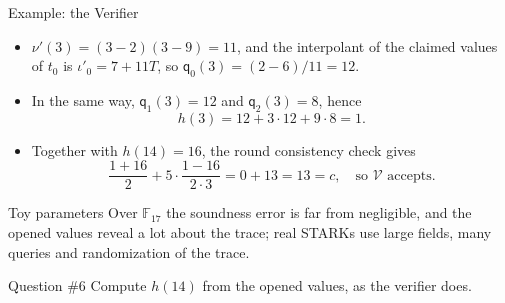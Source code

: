 \documentclass{zkdl-presentation-template}
\begin{document}
    \begin{frame}{Example: the Verifier}
        \begin{itemize}
            \item $\nu'(3) = (3 - 2)(3 - 9) = 11$, and the interpolant of the claimed values of $t_0$ is $\iota'_0 = 7 + 11T$, so $\mathsf{q}_0(3) = (2 - 6)/11 = 12$.\pause
            \item In the same way, $\mathsf{q}_1(3) = 12$ and $\mathsf{q}_2(3) = 8$, hence
            \begin{equation*}
                h(3) = 12 + 3 \cdot 12 + 9 \cdot 8 = 1.
            \end{equation*}
            \pause
            \vspace{-10pt}
            \item Together with $h(14) = 16$, the round consistency check gives
            \begin{equation*}
                \frac{1 + 16}{2} + 5 \cdot \frac{1 - 16}{2 \cdot 3} = 0 + 13 = 13 = c, \quad \text{so } \mathcal{V} \text{ accepts.}
            \end{equation*}
        \end{itemize}
        \pause

        \begin{alertblock}{Toy parameters}
            Over $\mathbb{F}_{17}$ the soundness error is far from negligible, and the opened values reveal a lot about the trace; real STARKs use large fields, many queries and randomization of the trace.
        \end{alertblock}
        \pause

        \begin{questionblock}{Question \#6}
            Compute $h(14)$ from the opened values, as the verifier does.
        \end{questionblock}
    \end{frame}
\end{document}
